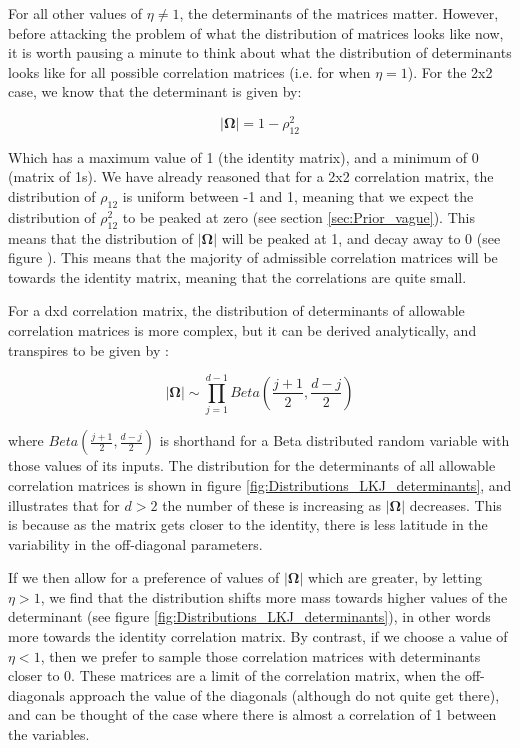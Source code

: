 \documentclass[11pt,fullpage]{book}
\begin{document}
For all other values of $\eta\neq 1$, the determinants of the matrices matter. However, before attacking the problem of what the distribution of matrices looks like now, it is worth pausing a minute to think about what the distribution of determinants looks like for all possible correlation matrices (i.e. for when $\eta=1$). For the 2x2 case, we know that the determinant is given by:

\begin{equation}
|\boldsymbol{\Omega}| = 1 - \rho_{12}^2
\end{equation}

Which has a maximum value of 1 (the identity matrix), and a minimum of 0 (matrix of 1s). We have already reasoned that for a 2x2 correlation matrix, the distribution of $\rho_{12}$ is uniform between -1 and 1, meaning that we expect the distribution of $\rho_{12}^2$ to be peaked at zero (see section \ref{sec:Prior_vague}). This means that the distribution of $|\boldsymbol{\Omega}|$ will be peaked at 1, and decay away to 0 (see figure ). This means that the majority of admissible correlation matrices will be towards the identity matrix, meaning that the correlations are quite small. 

For a dxd correlation matrix, the distribution of determinants of allowable correlation matrices is more complex, but it can be derived analytically, and transpires to be given by \cite{hanea2013asymptotic}:

\begin{equation}
|\boldsymbol{\Omega}| \sim \prod\limits_{j=1}^{d-1} Beta\left(\frac{j+1}{2},\frac{d-j}{2}\right)
\end{equation}

where $Beta\left(\frac{j+1}{2},\frac{d-j}{2}\right)$ is shorthand for a Beta distributed random variable with those values of its inputs. The distribution for the determinants of all allowable correlation matrices is shown in figure \ref{fig:Distributions_LKJ_determinants}, and illustrates that for $d>2$ the number of these is increasing as $|\boldsymbol{\Omega}|$ decreases. This is because as the matrix gets closer to the identity, there is less latitude in the variability in the off-diagonal parameters.

If we then allow for a preference of values of $|\boldsymbol{\Omega}|$ which are greater, by letting $\eta>1$, we find that the distribution shifts more mass towards higher values of the determinant (see figure \ref{fig:Distributions_LKJ_determinants}), in other words more towards the identity correlation matrix. By contrast, if we choose a value of $\eta<1$, then we prefer to sample those correlation matrices with determinants closer to 0. These matrices are a limit of the correlation matrix, when the off-diagonals approach the value of the diagonals (although do not  quite get there), and can be thought of  the case where there is almost a correlation of 1 between the variables.
\end{document}
